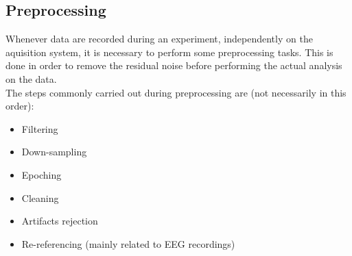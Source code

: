 \subsection{Preprocessing}
Whenever data are recorded during an experiment, independently on the aquisition
system, it is necessary to perform some preprocessing tasks. This is done in order to
remove the residual noise before performing the actual analysis on the data.\\
The steps commonly carried out during preprocessing are (not necessarily in
this order):
\begin{itemize}
    \item Filtering
    \item Down-sampling
    \item Epoching
    \item Cleaning
    \item Artifacts rejection
    \item Re-referencing (mainly related to EEG recordings) 
\end{itemize}
